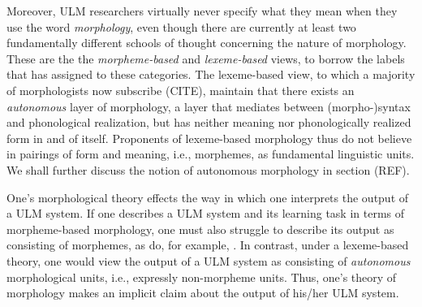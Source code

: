 Moreover, \ac{ULM} researchers virtually never specify what they mean
when they use the word \emph{morphology}, even though there
are currently at least two fundamentally different schools of thought concerning the nature of morphology. These are the 
the \emph{morpheme-based} and \emph{lexeme-based} views, to borrow the labels that \cite{aronoff:1994} has assigned 
to these categories. The lexeme-based view, to which a majority of morphologists now subscribe (CITE),
maintain that there exists an \emph{autonomous} layer of morphology, a layer that mediates between (morpho-)syntax
and phonological realization, but has neither meaning nor phonologically realized form in and of itself. Proponents
of lexeme-based morphology thus do not believe in pairings of form and meaning, i.e., morphemes, as fundamental linguistic
units. We shall further discuss the notion of autonomous morphology in section (REF). 

One's morphological theory effects the way in which one interprets the output of a \ac{ULM}  system. 
If one describes a \ac{ULM}  system and its learning task in terms of 
morpheme-based morphology, one must also struggle to 
describe its output as consisting of morphemes, as do, for example, 
\cite{creutz-and-lagus:2007,creutz-and-lagus:2005}. In contrast, under a 
lexeme-based theory, one would view the output of a \ac{ULM}  system as 
consisting of \emph{autonomous} morphological units, i.e., 
expressly non-morpheme units. 
Thus, one's theory of morphology makes an implicit claim about the output of 
his/her \ac{ULM}  system.

